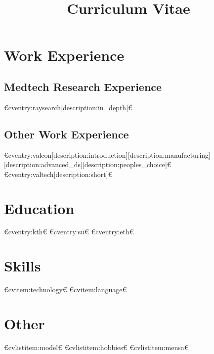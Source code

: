 
\title{Curriculum Vitae}



\newcommand{\role}{Data Scientist}
\newcommand{\company}{Lundbeck}
\geometry{
  left=20 mm,
  right=20 mm,
  top=20 mm,
  bottom=20 mm,
}



  \makecvtitle
  

  \section{Work Experience}
  \subsection{Medtech Research Experience}
  €cventry:raysearch[description:in_depth]€
  \subsection{Other Work Experience}
  €cventry:valcon[description:introduction][description:manufacturing][description:advanced_ds][description:peoples_choice]€
  €cventry:valtech[description:short]€

  \section{Education}
  €cventry:kth€
  €cventry:su€
  €cventry:eth€

  \section{Skills}
  €cvitem:technology€
  €cvitem:language€

  \section{Other}
  €cvlistitem:model€
  €cvlistitem:hobbies€
  €cvlistitem:mensa€

  
